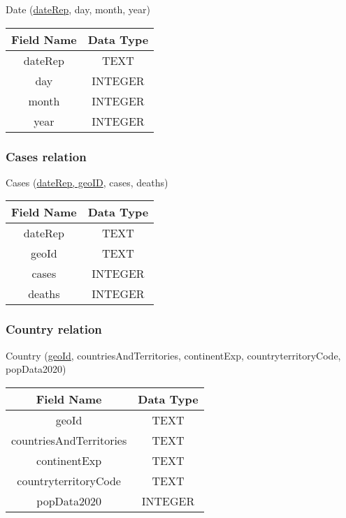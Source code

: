 \documentclass{article}
\begin{document}
Date (\underline{dateRep}, day, month, year)

\begin{center}
\begin{tabular}{ |c|c| }
\hline
\textbf{Field Name} & \textbf{Data Type} \\ \hline
dateRep & TEXT \\ \hline
day & INTEGER \\ \hline
month & INTEGER \\ \hline
year & INTEGER \\ \hline
\end{tabular}
\end{center}

\subsubsection{Cases relation}

Cases (\underline{dateRep, geoID}, cases, deaths)

\begin{center}
\begin{tabular}{ |c|c| }
\hline
\textbf{Field Name} & \textbf{Data Type} \\ \hline
dateRep & TEXT \\ \hline
geoId & TEXT \\ \hline
cases & INTEGER \\ \hline
deaths & INTEGER \\ \hline
\end{tabular}
\end{center}

\subsubsection{Country relation}

Country (\underline{geoId}, countriesAndTerritories, continentExp, countryterritoryCode, popData2020)

\begin{center}
\begin{tabular}{ |c|c| }
\hline
\textbf{Field Name} & \textbf{Data Type} \\ \hline
geoId & TEXT \\ \hline
countriesAndTerritories & TEXT \\ \hline
continentExp & TEXT \\ \hline
countryterritoryCode & TEXT \\ \hline
popData2020 & INTEGER \\ \hline
\end{tabular}
\end{center}
\end{document}
